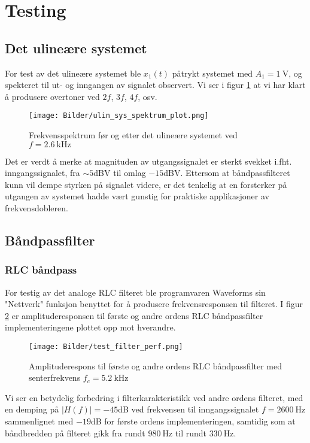 \newpage
\section{Testing}

\subsection{Det ulineære systemet}
For test av det ulineære systemet ble $x_1(t)$ påtrykt systemet med $A_1 = \SI{1}{\volt}$, og 
spekteret til ut- og inngangen av signalet observert. Vi ser i figur \ref{fig:test_ulin_sys} at 
vi har klart å produsere overtoner ved $2f$, $3f$, $4f$, osv.
\begin{figure}[H]
    \centering 
    \texttt{[image: Bilder/ulin\_sys\_spektrum\_plot.png]}
    \caption{Frekvensspektrum før og etter det ulineære systemet ved $f = \SI{2.6}{\kilo\hertz}$}
    \label{fig:test_ulin_sys}
\end{figure}

Det er verdt å merke at magnituden av utgangssignalet er sterkt svekket i.fht. inngangssignalet, fra $\sim 5$dBV
til omlag $-15$dBV. Ettersom at båndpassfilteret kunn vil dempe styrken på signalet videre, er det tenkelig 
at en forsterker på utgangen av systemet hadde vært gunstig for praktiske applikasjoner av frekvensdobleren.

\subsection{Båndpassfilter}
\subsubsection{RLC båndpass}
For testig av det analoge RLC filteret ble programvaren Waveforms \cite{waveforms} sin "Nettverk" funksjon 
benyttet for å produsere frekvensresponsen til filteret. I figur \ref{fig:test_analog_filter_perf} er 
amplituderesponsen til første og andre ordens RLC båndpassfilter implementeringene plottet opp mot hverandre.

\begin{figure}[H]
    \centering 
    \texttt{[image: Bilder/test\_filter\_perf.png]}
    \caption{Amplituderespons til første og andre ordens RLC båndpassfilter med senterfrekvens $f_c = \SI{5.2}{\kilo\hertz}$}
    \label{fig:test_analog_filter_perf}
\end{figure}

Vi ser en betydelig forbedring i filterkarakteristikk ved andre ordens filteret, med en demping på $|H(f)| = -45$dB ved 
frekvensen til inngangssignalet $f = \SI{2600}{\hertz}$ sammenlignet med $-19$dB for første ordens implementeringen, samtidig som at
båndbredden på filteret gikk fra rundt $\SI{980}{\hertz}$ til rundt $\SI{330}{\hertz}$.

